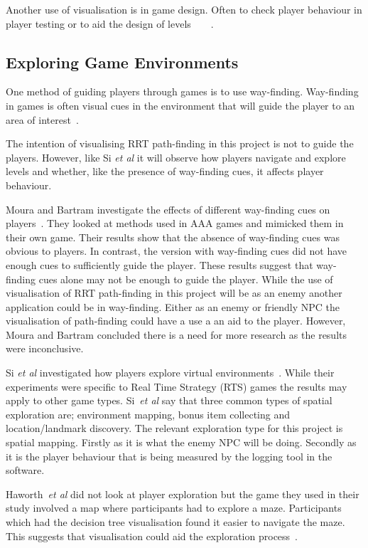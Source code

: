 \documentclass[journal]{IEEEtran}
\begin{document}
Another use of visualisation is in game design. Often to check player behaviour in player testing or to aid the design of levels~\cite{Nelson2011}~\cite{bauer2012}~\cite{Tremblay2013}~\cite{Tremblay2014}. 

\subsection{Exploring Game Environments}
One method of guiding players through games is to use way-finding. Way-finding in games is often visual cues in the environment that will guide the player to an area of interest~\cite{si2017, Bacim2008}. 

The intention of visualising RRT path-finding in this project is not to guide the players. However, like Si \textit{et al}  it will observe how players navigate and explore levels and whether, like the presence of way-finding cues, it affects player behaviour. 

Moura and Bartram investigate the effects of different way-finding cues on players~\cite{moura2014}.  They looked at methods used in AAA games and mimicked them in their own game. Their results show that the absence of way-finding cues was obvious to players. In contrast, the version with way-finding cues did not have enough cues to sufficiently guide the player. These results suggest that way-finding cues alone may not be enough to guide the player. While the use of visualisation of RRT path-finding in this project will be as an enemy another application could be in way-finding. Either as an enemy or friendly NPC the visualisation of path-finding could have a use a an aid to the player. However, Moura and Bartram concluded there is a need for more research as the results were inconclusive. 
 
Si \textit{et al} investigated how players explore virtual environments~\cite{si2017}. While their experiments were specific to Real Time Strategy (RTS) games the results may apply to other game types. Si~\textit{et al} say that three common types of spatial exploration are; environment mapping, bonus item collecting and location/landmark discovery. The relevant exploration type for this project is spatial mapping. Firstly as it is what the enemy NPC will be doing.  Secondly as it is the player behaviour that is being measured by the logging tool in the software.

Haworth~\textit{et al} did not look at player exploration but the game they used in their study involved a map where participants had to explore a maze. Participants which had the decision tree visualisation found it easier to navigate the maze. This suggests that visualisation could aid the exploration process~\cite{Haworth2010}.
\end{document}
